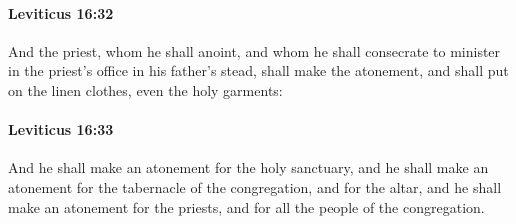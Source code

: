 		\paragraph{Leviticus 16:32} %
			\label{LEVITICUS-16-32}

			And the priest, whom he shall anoint, and whom he shall consecrate to minister in the priest’s office in his father’s stead, shall make the atonement, and shall put on the linen clothes, even the holy garments:


		\paragraph{Leviticus 16:33} %
			\label{LEVITICUS-16-33}

			And he shall make an atonement for the holy sanctuary, and he shall make an atonement for the tabernacle of the congregation, and for the altar, and he shall make an atonement for the priests, and for all the people of the congregation.

